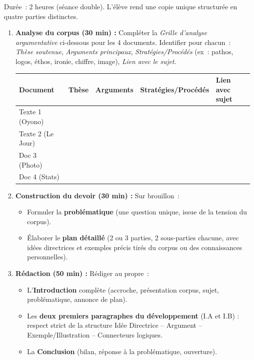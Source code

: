\documentclass[11pt]{article}
\newcommand{\cle}[1]{{\popxbold\color{popdark}#1}}
\newcounter{popsec}
\newcounter{popsub}
\newcommand{\courssub}[1]{%
  \stepcounter{popsub}%
  \par\vspace{9pt}\noindent{\popxbold\fontsize{11.5}{13}\selectfont\color{popink}{\color{poporange}\thepopsec.\thepopsub}\hspace{6pt}#1}\par\nopagebreak\vspace{4pt}
}
\begin{document}
\courssub{Consignes}
\noindent Durée~: 2 heures (séance double). L'élève rend une copie unique structurée en quatre parties distinctes.
\begin{enumerate}
    \item \textbf{Analyse du corpus (30 min) :} Compléter la \emph{Grille d'analyse argumentative} ci-dessous pour les 4 documents. Identifier pour chacun~: \textit{Thèse soutenue}, \textit{Arguments principaux}, \textit{Stratégies/Procédés} (ex~: pathos, logos, éthos, ironie, chiffre, image), \textit{Lien avec le sujet}.
    \begin{center}
    \begin{tabularx}{\linewidth}{|l|X|X|X|X|}\hline
    \rowcolor{popblueL} \textbf{Document} & \textbf{Thèse} & \textbf{Arguments} & \textbf{Stratégies/Procédés} & \textbf{Lien avec sujet} \\ \hline
    Texte 1 (Oyono) & & & & \\ \hline
    Texte 2 (Le Jour) & & & & \\ \hline
    Doc 3 (Photo) & & & & \\ \hline
    Doc 4 (Stats) & & & & \\ \hline
    \end{tabularx}
    \end{center}
    \item \textbf{Construction du devoir (30 min) :} Sur brouillon~:
    \begin{itemize}
        \item Formuler la \textbf{problématique} (une question unique, issue de la tension du corpus).
        \item Élaborer le \textbf{plan détaillé} (2 ou 3 parties, 2 sous-parties chacune, avec idées directrices et exemples précis tirés du corpus ou des connaissances personnelles).
    \end{itemize}
    \item \textbf{Rédaction (50 min) :} Rédiger au propre~:
    \begin{itemize}
        \item L'\textbf{Introduction} complète (accroche, présentation corpus, sujet, problématique, annonce de plan).
        \item Les \textbf{deux premiers paragraphes du développement} (I.A et I.B) : respect strict de la structure \cle{Idée Directrice} -- \cle{Argument} -- \cle{Exemple/Illustration} -- \cle{Connecteurs logiques}.
        \item La \textbf{Conclusion} (bilan, réponse à la problématique, ouverture).

\end{itemize}
\end{enumerate}
\end{document}

